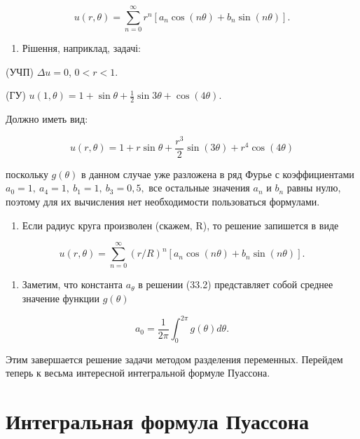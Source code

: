 \documentclass[
  ukrainian,
]{article}
\providecommand{\tightlist}{%
  \setlength{\itemsep}{0pt}\setlength{\parskip}{0pt}}
\begin{document}
\[
u(r, \theta) = \sum_{n=0}^{\infty} r^n [a_n \cos(n\theta) + b_n \sin(n\theta)].
\]

\begin{enumerate}
\def\labelenumi{\arabic{enumi}.}
\setcounter{enumi}{1}
\tightlist
\item
  Рішення, наприклад, задачі:
\end{enumerate}

(УЧП) \(\Delta u = 0\), \(0 < r < 1\).

(ГУ)
\(u(1, \theta) = 1 + \sin \theta + \frac{1}{2} \sin 3\theta + \cos (4\theta)\).

Должно иметь вид:

\[
u(r, \theta) = 1 + r \sin \theta + \frac{r^3}{2} \sin (3\theta) + r^4 \cos (4\theta)
\]

поскольку \(g(\theta)\) в данном случае уже разложена в ряд Фурье с
коэффициентами \(a_0=1,\ a_4=1,\ b_1=1,\ b_3=0,5,\) все остальные
значения \(a_n\) и \(b_n\) равны нулю, поэтому для их вычисления нет
необходимости пользоваться формулами.

\begin{enumerate}
\def\labelenumi{\arabic{enumi}.}
\setcounter{enumi}{2}
\tightlist
\item
  Если радиус круга произволен (скажем, R), то решение запишется в виде
\end{enumerate}

\[
u(r, \theta) = \sum_{n=0}^{\infty} (r/R)^n [a_n \cos(n\theta) + b_n \sin(n\theta)].
\]

\begin{enumerate}
\def\labelenumi{\arabic{enumi}.}
\setcounter{enumi}{3}
\tightlist
\item
  Заметим, что константа \(a_{\theta}\) в решении (33.2) представляет
  собой среднее значение функции \(g\left(\theta\right)\)
\end{enumerate}

\[
a_0 = \frac{1}{2\pi} \int_0^{2\pi} g(\theta) d\theta.
\]

Этим завершается решение задачи методом разделения переменных. Перейдем
теперь к весьма интересной интегральной формуле Пуассона.

\section{Интегральная формула
Пуассона}\label{ux438ux43dux442ux435ux433ux440ux430ux43bux44cux43dux430ux44f-ux444ux43eux440ux43cux443ux43bux430-ux43fux443ux430ux441ux441ux43eux43dux430}
\end{document}
